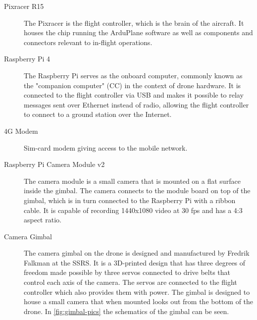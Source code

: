 \documentclass[nofilelist]{cslthse-msc}
\begin{document}
\begin{description}
   \item[Pixracer R15] The Pixracer is the flight controller, which is the brain of the aircraft. It houses the chip running the ArduPlane software as well as components and connectors relevant to in-flight operations.

   \item[Raspberry Pi 4] The Raspberry Pi serves as the onboard computer, commonly known as the "companion computer" (CC) in the context of drone hardware. It is connected to the flight controller via USB and makes it possible to relay messages sent over Ethernet instead of radio, allowing the flight controller to connect to a ground station over the Internet. 
   
   \item[4G Modem] Sim-card modem giving access to the mobile network. 
   
   \item[Raspberry Pi Camera Module v2] The camera module is a small camera that is mounted on a flat surface inside the gimbal. The camera connects to the module board on top of the gimbal, which is in turn connected to the Raspberry Pi with a ribbon cable. It is capable of recording 1440x1080 video at 30 fps and has a 4:3 aspect ratio. 

   \item[Camera Gimbal] The camera gimbal on the drone is designed and manufactured by Fredrik Falkman at the SSRS. It is a 3D-printed design that has three degrees of freedom made possible by three servos connected to drive belts that control each axis of the camera. The servos are connected to the flight controller which also provides them with power. The gimbal is designed to house a small camera that when mounted looks out from the bottom of the drone. In \ref{fig:gimbal-pics} the schematics of the gimbal can be seen. 
   

\end{description}
\end{document}
